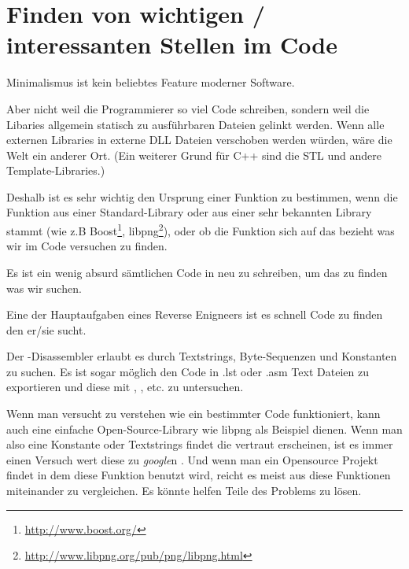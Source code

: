 \chapter{Finden von wichtigen / interessanten Stellen im Code}

Minimalismus ist kein beliebtes Feature moderner Software.


Aber nicht weil die Programmierer so viel Code schreiben, sondern weil die Libaries
allgemein statisch zu ausf\"uhrbaren Dateien gelinkt werden. Wenn alle externen
Libraries in externe DLL Dateien verschoben werden w\"urden, w\"are die Welt ein
anderer Ort. (Ein weiterer Grund f\"ur C++ sind die \ac{STL} und andere Template-Libraries.)

\newcommand{\FOOTNOTEBOOST}{\footnote{\url{http://www.boost.org/}}}
\newcommand{\FOOTNOTELIBPNG}{\footnote{\url{http://www.libpng.org/pub/png/libpng.html}}}

Deshalb ist es sehr wichtig den Ursprung einer Funktion zu bestimmen, wenn die
Funktion aus einer Standard-Library oder aus einer sehr bekannten Library stammt
(wie z.B Boost\FOOTNOTEBOOST, libpng\FOOTNOTELIBPNG), oder ob die Funktion sich
auf das bezieht was wir im Code versuchen zu finden.

Es ist ein wenig absurd s\"amtlichen Code in \CCpp neu zu schreiben, um das zu
finden was wir suchen.

Eine der Hauptaufgaben eines Reverse Enigneers ist es schnell Code zu finden den
er/sie sucht.

\myindex{\GrepUsage}

Der \IDA-Disassembler erlaubt es durch Textstrings, Byte-Sequenzen und Konstanten
zu suchen.  Es ist sogar m\"oglich den Code in .lst oder .asm Text Dateien zu
exportieren und diese mit , , etc. zu untersuchen.

Wenn man versucht zu verstehen wie ein bestimmter Code funktioniert, kann auch
eine einfache Open-Source-Library wie libpng als Beispiel dienen.
Wenn man also eine Konstante oder Textstrings findet die vertraut erscheinen, ist
es immer einen Versuch wert diese zu \emph{google}n .
Und wenn man ein Opensource Projekt findet in dem diese Funktion benutzt wird, 
reicht es meist aus diese Funktionen miteinander zu vergleichen.
Es k\"onnte helfen Teile des Problems zu l\"osen.


